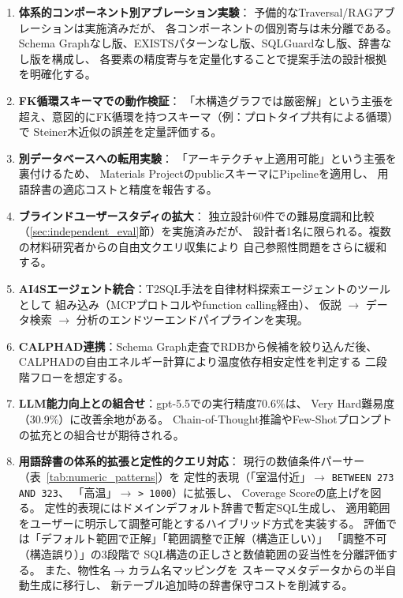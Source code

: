 \documentclass[5p,twocolumn]{elsarticle}
\begin{document}
\begin{enumerate}
  \item \textbf{体系的コンポーネント別アブレーション実験}：
    予備的なTraversal/RAGアブレーションは実施済みだが、
    各コンポーネントの個別寄与は未分離である。
    Schema Graphなし版、EXISTSパターンなし版、SQLGuardなし版、辞書なし版を構成し、
    各要素の精度寄与を定量化することで提案手法の設計根拠を明確化する。
  \item \textbf{FK循環スキーマでの動作検証}：
    「木構造グラフでは厳密解」という主張を超え、意図的にFK循環を持つスキーマ（例：プロトタイプ共有による循環）で
    Steiner木近似の誤差を定量評価する。
  \item \textbf{別データベースへの転用実験}：
    「アーキテクチャ上適用可能」という主張を裏付けるため、
    Materials ProjectのpublicスキーマにPipelineを適用し、
    用語辞書の適応コストと精度を報告する。
  \item \textbf{ブラインドユーザースタディの拡大}：
    独立設計60件での難易度調和比較（\ref{sec:independent_eval}節）を実施済みだが、
    設計者1名に限られる。複数の材料研究者からの自由文クエリ収集により
    自己参照性問題をさらに緩和する。
  \item \textbf{AI4Sエージェント統合}：T2SQL手法を自律材料探索エージェントのツールとして
    組み込み（MCPプロトコルやfunction calling経由）、
    仮説 $\to$ データ検索 $\to$ 分析のエンドツーエンドパイプラインを実現。
  \item \textbf{CALPHAD連携}：Schema Graph走査でRDBから候補を絞り込んだ後、
    CALPHADの自由エネルギー計算により温度依存相安定性を判定する
    二段階フローを想定する。
  \item \textbf{LLM能力向上との組合せ}：gpt-5.5での実行精度70.6\%は、
    Very Hard難易度（30.9\%）に改善余地がある。
    Chain-of-Thought推論やFew-Shotプロンプトの拡充との組合せが期待される。
  \item \textbf{用語辞書の体系的拡張と定性的クエリ対応}：
    現行の数値条件パーサー（表~\ref{tab:numeric_patterns}）を
    定性的表現（「室温付近」$\to$ \texttt{BETWEEN 273 AND 323}、
    「高温」$\to$ \texttt{> 1000}）に拡張し、
    Coverage Scoreの底上げを図る。
    定性的表現にはドメインデフォルト辞書で暫定SQL生成し、
    適用範囲をユーザーに明示して調整可能とするハイブリッド方式を実装する。
    評価では「デフォルト範囲で正解」「範囲調整で正解（構造正しい）」
    「調整不可（構造誤り）」の3段階で
    SQL構造の正しさと数値範囲の妥当性を分離評価する。
    また、物性名$\to$カラム名マッピングを
    スキーマメタデータからの半自動生成に移行し、
    新テーブル追加時の辞書保守コストを削減する。

\end{enumerate}
\end{document}
